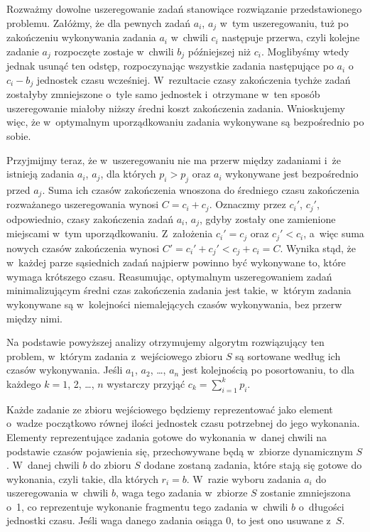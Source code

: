 
\subproblem %
Rozważmy dowolne uszeregowanie zadań stanowiące rozwiązanie przedstawionego problemu.
Załóżmy, że dla pewnych zadań $a_i$, $a_j$ w~tym uszeregowaniu, tuż po zakończeniu wykonywania zadania $a_i$ w~chwili $c_i$ następuje przerwa, czyli kolejne zadanie $a_j$ rozpoczęte zostaje w~chwili $b_j$ późniejszej niż $c_i$.
Moglibyśmy wtedy jednak usunąć ten odstęp, rozpoczynając wszystkie zadania następujące po $a_i$ o~$c_i-b_j$ jednostek czasu wcześniej.
W~rezultacie czasy zakończenia tychże zadań zostałyby zmniejszone o~tyle samo jednostek i~otrzymane w~ten sposób uszeregowanie miałoby niższy średni koszt zakończenia zadania.
Wnioskujemy więc, że w~optymalnym uporządkowaniu zadania wykonywane są bezpośrednio po sobie.

Przyjmijmy teraz, że w~uszeregowaniu nie ma przerw między zadaniami i~że istnieją zadania $a_i$, $a_j$, dla których $p_i>p_j$ oraz $a_i$ wykonywane jest bezpośrednio przed $a_j$.
Suma ich czasów zakończenia wnoszona do średniego czasu zakończenia rozważanego uszeregowania wynosi $C=c_i+c_j$.
Oznaczmy przez $c_i'$, $c_j'$, odpowiednio, czasy zakończenia zadań $a_i$, $a_j$, gdyby zostały one zamienione miejscami w~tym uporządkowaniu.
Z~założenia $c_i'=c_j$ oraz $c_j'<c_i$, a~więc suma nowych czasów zakończenia wynosi $C'=c_i'+c_j'<c_j+c_i=C$.
Wynika stąd, że w~każdej parze sąsiednich zadań najpierw powinno być wykonywane to, które wymaga krótszego czasu.
Reasumując, optymalnym uszeregowaniem zadań minimalizującym średni czas zakończenia zadania jest takie, w~którym zadania wykonywane są w~kolejności niemalejących czasów wykonywania, bez przerw między nimi.

Na podstawie powyższej analizy otrzymujemy algorytm rozwiązujący ten problem, w~którym zadania z~wejściowego zbioru $S$ są sortowane według ich czasów wykonywania.
Jeśli $a_1$, $a_2$, \dots, $a_n$ jest kolejnością po posortowaniu, to dla każdego $k=1$, 2, \dots, $n$ wystarczy przyjąć $c_k=\sum_{i=1}^kp_i$.

\subproblem %
Każde zadanie ze zbioru wejściowego będziemy reprezentować jako element o~wadze początkowo równej ilości jednostek czasu potrzebnej do jego wykonania.
Elementy reprezentujące zadania gotowe do wykonania w~danej chwili na podstawie czasów pojawienia się, przechowywane będą w~zbiorze dynamicznym $S$.
W~danej chwili $b$ do zbioru $S$ dodane zostaną zadania, które stają się gotowe do wykonania, czyli takie, dla których $r_i=b$.
W~razie wyboru zadania $a_i$ do uszeregowania w~chwili $b$, waga tego zadania w~zbiorze $S$ zostanie zmniejszona o~1, co reprezentuje wykonanie fragmentu tego zadania w~chwili $b$ o~długości jednostki czasu.
Jeśli waga danego zadania osiąga 0, to jest ono usuwane z~$S$.

